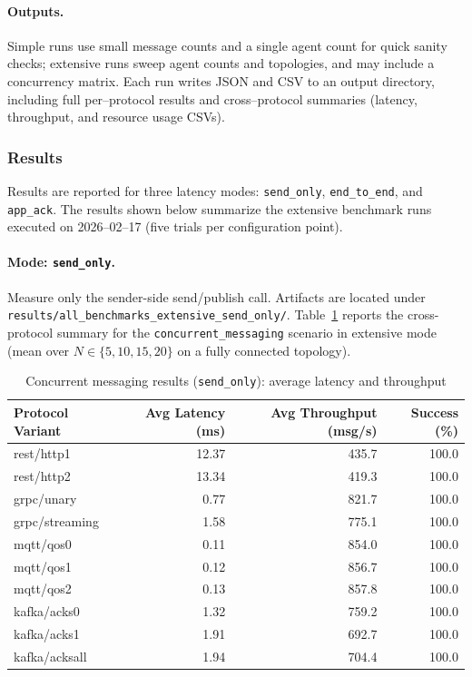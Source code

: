 \paragraph{Outputs.}
Simple runs use small message counts and a single agent count for quick sanity checks; extensive runs sweep agent counts and topologies, and may include a concurrency matrix. Each run writes JSON and CSV to an output directory, including full per--protocol results and cross--protocol summaries (latency, throughput, and resource usage CSVs).

\subsubsection{Results}
Results are reported for three latency modes: \texttt{send\_only}, \texttt{end\_to\_end}, and \texttt{app\_ack}. The results shown below summarize the extensive benchmark runs executed on 2026--02--17 (five trials per configuration point).

\paragraph{Mode: \texttt{send\_only}.}
Measure only the sender-side send/publish call. Artifacts are located under \texttt{results/all\_benchmarks\_extensive\_send\_only/}.
Table~\ref{tab:concurrent-send-only} reports the cross-protocol summary for the \texttt{concurrent\_messaging} scenario in extensive mode (mean over $N \in \{5,10,15,20\}$ on a fully connected topology).

\begin{table}[H]
\centering

\label{tab:concurrent-send-only}
\begin{tabular}{l|r|r|r}
\toprule
\textbf{Protocol Variant} & \textbf{Avg Latency (ms)} & \textbf{Avg Throughput (msg/s)} & \textbf{Success (\%)} \\
\midrule
rest/http1        & 12.37 & 435.7 & 100.0 \\
rest/http2        & 13.34 & 419.3 & 100.0 \\
grpc/unary        &  0.77 & 821.7 & 100.0 \\
grpc/streaming    &  1.58 & 775.1 & 100.0 \\
mqtt/qos0         &  0.11 & 854.0 & 100.0 \\
mqtt/qos1         &  0.12 & 856.7 & 100.0 \\
mqtt/qos2         &  0.13 & 857.8 & 100.0 \\
kafka/acks0       &  1.32 & 759.2 & 100.0 \\
kafka/acks1       &  1.91 & 692.7 & 100.0 \\
kafka/acksall     &  1.94 & 704.4 & 100.0 \\
\bottomrule
\end{tabular}
\caption{Concurrent messaging results (\texttt{send\_only}): average latency and throughput}
\end{table}

